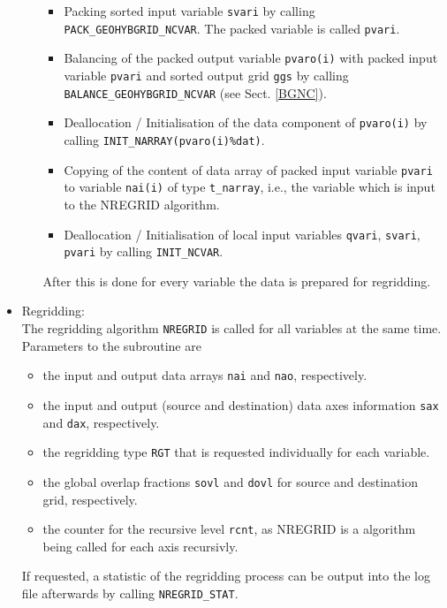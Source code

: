 \documentclass[11pt,twoside]{article}
\begin{document}
\begin{itemize}
\begin{itemize}
\begin{itemize}
\item Packing sorted input variable \verb|svari| by calling 
\verb|PACK_GEOHYBGRID_NCVAR|. The packed variable is called \verb|pvari|.
\item Balancing of the packed output variable \verb|pvaro(i)| with packed input
variable \verb|pvari| and sorted output grid \verb|ggs| 
by calling \verb|BALANCE_GEOHYBGRID_NCVAR| (see Sect. \ref{BGNC}).
\item Deallocation / Initialisation of the data component
of \verb|pvaro(i)| by calling \verb|INIT_NARRAY(pvaro(i)%dat)|.
\item Copying of the content of data array of packed input
variable \verb|pvari| to variable \verb|nai(i)| of
type \verb|t_narray|, i.e., the variable which is input to the NREGRID
algorithm. 
\item Deallocation / Initialisation of local input variables \verb|qvari|, 
\verb|svari|, \verb|pvari| by calling \verb|INIT_NCVAR|.  
\end{itemize} %
After this is done for every variable the data is prepared  for regridding.
\end{itemize} %
\item Regridding:\\
The regridding algorithm \verb|NREGRID| is called for all variables at
the same time. Parameters to the subroutine are 
\begin{itemize} %
\item the input and output data arrays \verb|nai| and \verb|nao|,
respectively. 
\item the input and output (source and destination) data axes
information \verb|sax| and \verb|dax|, respectively.
\item the regridding type \verb|RGT| that is requested individually for each
variable.
\item the global overlap fractions \verb|sovl| and \verb|dovl| for
source and destination grid, respectively.
\item the counter for the recursive level \verb|rcnt|, as NREGRID is a
algorithm being called for each axis recursivly.
\end{itemize} %
If requested, a statistic of the regridding process can be
output into the log file afterwards by calling \verb|NREGRID_STAT|.


\end{itemize}
\end{document}
